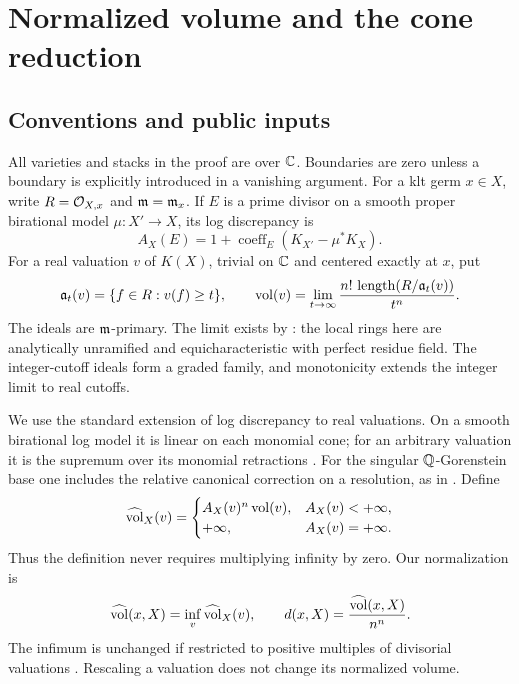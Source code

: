 \section{Normalized volume and the cone reduction}\label{sec:cones}

\subsection{Conventions and public inputs}

All varieties and stacks in the proof are over \(\mathbb C\). Boundaries
are zero unless a boundary is explicitly introduced in a vanishing
argument. For a klt germ \(x\in X\), write \(R=\mathcal O_{X,x}\) and
\(\mathfrak m=\mathfrak m_x\). If \(E\) is a prime divisor on a smooth proper
birational model \(\mu\colon X'\to X\), its log discrepancy is
\[
 A_X(E)=1+\operatorname{coeff}_E(K_{X'}-\mu^*K_X).
\]
For a real valuation \(v\) of \(K(X)\), trivial on \(\mathbb C\) and
centered exactly at \(x\), put
\[
 \mathfrak a_t(v)=\{f\in R:v(f)\ge t\},\qquad
 \operatorname{vol}(v)=\lim_{t\to\infty}
     \frac{n!\,\operatorname{length}(R/\mathfrak a_t(v))}{t^n}.
\]
The ideals are \(\mathfrak m\)-primary. The limit exists by
\cite[Theorem~5.8]{Cutkosky13}: the local rings here are analytically
unramified and equicharacteristic with perfect residue field. The
integer-cutoff ideals form a graded family, and monotonicity extends
the integer limit to real cutoffs.

We use the standard extension of log discrepancy to real valuations.
On a smooth birational log model it is linear on each monomial cone;
for an arbitrary valuation it is the supremum over its monomial
retractions \cite[Proposition~5.1 and Corollary~5.4]{JM12}.
For the singular \(\mathbb Q\)-Gorenstein base one includes the relative
canonical correction on a resolution, as in
\cite[Section~2.1]{Li18}. Define
\[
 \widehat{\operatorname{vol}}_X(v)=
 \begin{cases}
 A_X(v)^n\operatorname{vol}(v),&A_X(v)<+\infty,\\
 +\infty,&A_X(v)=+\infty.
 \end{cases}
\]
Thus the definition never requires multiplying infinity by zero.
Our normalization is
\begin{equation}\label{cone:eq-density}
 \widehat{\operatorname{vol}}(x,X)=\inf_v\widehat{\operatorname{vol}}_X(v),\qquad
 d(x,X)=\frac{\widehat{\operatorname{vol}}(x,X)}{n^n}.
\end{equation}
The infimum is unchanged if restricted to positive multiples of
divisorial valuations \cite[Theorem~2.5]{LiXu18}.
Rescaling a valuation does not change its
normalized volume.

